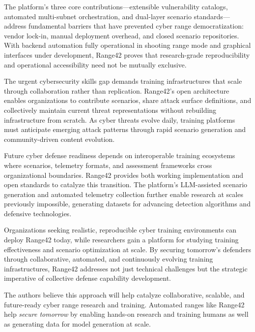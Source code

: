 \documentclass[11pt]{article}
\begin{document}
The platform's three core contributions---extensible vulnerability catalogs, automated multi-subnet orchestration, and dual-layer scenario standards---address fundamental barriers that have prevented cyber range democratization: vendor lock-in, manual deployment overhead, and closed scenario repositories. With backend automation fully operational in shooting range mode and graphical interfaces under development, Range42 proves that research-grade reproducibility and operational accessibility need not be mutually exclusive.

The urgent cybersecurity skills gap demands training infrastructures that scale through collaboration rather than replication. Range42's open architecture enables organizations to contribute scenarios, share attack surface definitions, and collectively maintain current threat representations without rebuilding infrastructure from scratch. As cyber threats evolve daily, training platforms must anticipate emerging attack patterns through rapid scenario generation and community-driven content evolution.

Future cyber defense readiness depends on interoperable training ecosystems where scenarios, telemetry formats, and assessment frameworks cross organizational boundaries. Range42 provides both working implementation and open standards to catalyze this transition. The platform's LLM-assisted scenario generation and automated telemetry collection further enable research at scales previously impossible, generating datasets for advancing detection algorithms and defensive technologies.

Organizations seeking realistic, reproducible cyber training environments can deploy Range42 today, while researchers gain a platform for studying training effectiveness and scenario optimization at scale. By securing tomorrow's defenders through collaborative, automated, and continuously evolving training infrastructures, Range42 addresses not just technical challenges but the strategic imperative of collective defense capability development.

The authors believe this approach will help catalyze collaborative, scalable, and future-ready cyber range research and training.
Automated ranges like Range42 help \emph{secure tomorrow} by enabling hands-on research and training humans as well as generating data for model generation at scale.
\end{document}
